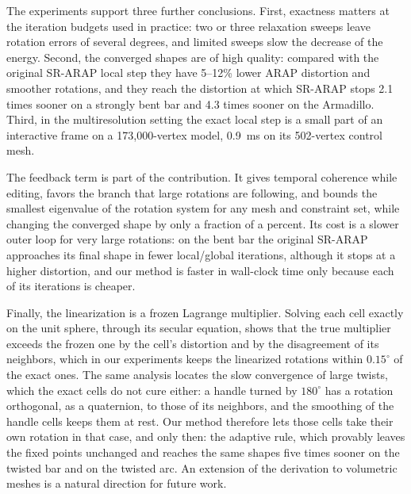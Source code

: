 \documentclass{birkjour}
\theoremstyle{remark}
\numberwithin{equation}{section}
\begin{document}
The experiments support three further conclusions. First, exactness matters at the iteration budgets used in practice: two or three relaxation sweeps leave rotation errors of several degrees, and limited sweeps slow the decrease of the energy. Second, the converged shapes are of high quality: compared with the original SR-ARAP local step they have 5--12\% lower ARAP distortion and smoother rotations, and they reach the distortion at which SR-ARAP stops 2.1 times sooner on a strongly bent bar and 4.3 times sooner on the Armadillo. Third, in the multiresolution setting the exact local step is a small part of an interactive frame on a 173{,}000-vertex model, 0.9~ms on its 502-vertex control mesh.

The feedback term is part of the contribution. It gives temporal coherence while editing, favors the branch that large rotations are following, and bounds the smallest eigenvalue of the rotation system for any mesh and constraint set, while changing the converged shape by only a fraction of a percent. Its cost is a slower outer loop for very large rotations: on the bent bar the original SR-ARAP approaches its final shape in fewer local/global iterations, although it stops at a higher distortion, and our method is faster in wall-clock time only because each of its iterations is cheaper.

Finally, the linearization is a frozen Lagrange multiplier. Solving each cell exactly on the unit sphere, through its secular equation, shows that the true multiplier exceeds the frozen one by the cell's distortion and by the disagreement of its neighbors, which in our experiments keeps the linearized rotations within $0.15^\circ$ of the exact ones. The same analysis locates the slow convergence of large twists, which the exact cells do not cure either: a handle turned by $180^\circ$ has a rotation orthogonal, as a quaternion, to those of its neighbors, and the smoothing of the handle cells keeps them at rest. Our method therefore lets those cells take their own rotation in that case, and only then: the adaptive rule, which provably leaves the fixed points unchanged and reaches the same shapes five times sooner on the twisted bar and on the twisted arc. An extension of the derivation to volumetric meshes is a natural direction for future work.








\end{document}
